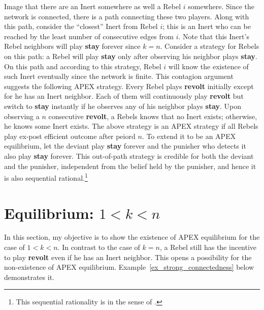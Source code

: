 \documentclass[12pt,letter]{article}
\theoremstyle{definition}
\theoremstyle{remark}
\theoremstyle{claim}
\begin{document}
Image that there are an Inert somewhere as well a Rebel $i$ somewhere. Since the network is connected, there is a path connecting these two players. Along with this path, consider the ``closest'' Inert from Rebel $i$; this is an Inert who can be reached by the least number of consecutive edges from $i$. Note that this Inert's Rebel neighbors will play \textbf{stay} forever since $k=n$. Consider a strategy for Rebels on this path: a Rebel will play \textbf{stay} only after observing his neighbor plays \textbf{stay}.  On this path and according to this  strategy, Rebel $i$ will know the existence of such Inert eventually since the network is finite. This contagion argument suggests the following APEX strategy. Every Rebel plays \textbf{revolt} initially except for he has an Inert neighbor. Each of them will continuously play \textbf{revolt} but switch to \textbf{stay} instantly if he observes any of his neighbor plays \textbf{stay}. Upon observing a $n$ consecutive \textbf{revolt}, a Rebels knows that no Inert exists; otherwise, he knows some Inert exists. The above strategy is an APEX strategy if all Rebels play ex-post efficient outcome after peiord $n$. To extend it to be an APEX equilibrium, let the deviant play \textbf{stay} forever and the punisher who detects it also play \textbf{stay} forever. This out-of-path strategy is credible for both the deviant and the punisher, independent from the belief held by the punisher, and hence it is also sequential rational.\footnote{This sequential rationality is in the sense of \citep{Krep_Wilson1982}.}




\section{Equilibrium: $1<k<n$}
\label{sec:equilibrium_2}

In this section, my objective is to show the existence of APEX equilibrium for the case of $1<k<n$. In contrast to the case of $k=n$, a Rebel still has the incentive to play \textbf{revolt} even if he has an Inert neighbor. This opens a possibility for the non-existence of APEX equilibrium. Example~\ref{ex_strong_connectedness} below demonstrates it.
\end{document}
